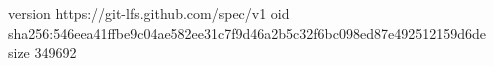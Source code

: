 version https://git-lfs.github.com/spec/v1
oid sha256:546eea41ffbe9c04ae582ee31c7f9d46a2b5c32f6bc098ed87e492512159d6de
size 349692
